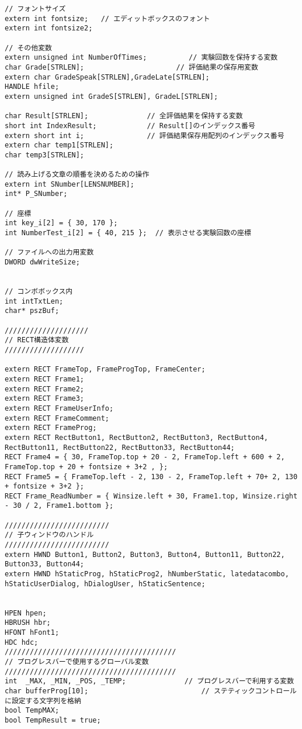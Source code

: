 \begin{lstlisting}[caption=main.cpp]
// フォントサイズ
extern int fontsize;   // エディットボックスのフォント
extern int fontsize2;

// その他変数
extern unsigned int NumberOfTimes;          // 実験回数を保持する変数
char Grade[STRLEN];                      // 評価結果の保存用変数
extern char GradeSpeak[STRLEN],GradeLate[STRLEN];
HANDLE hfile;
extern unsigned int GradeS[STRLEN], GradeL[STRLEN];

char Result[STRLEN];              // 全評価結果を保持する変数
short int IndexResult;            // Result[]のインデックス番号 
extern short int i;               // 評価結果保存用配列のインデックス番号
extern char temp1[STRLEN];
char temp3[STRLEN];

// 読み上げる文章の順番を決めるための操作
extern int SNumber[LENSNUMBER];
int* P_SNumber;

// 座標
int key_i[2] = { 30, 170 };         
int NumberTest_i[2] = { 40, 215 };  // 表示させる実験回数の座標

// ファイルへの出力用変数
DWORD dwWriteSize;


// コンボボックス内
int intTxtLen;
char* pszBuf;

////////////////////
// RECT構造体変数
///////////////////
	
extern RECT FrameTop, FrameProgTop, FrameCenter;
extern RECT Frame1;
extern RECT Frame2;
extern RECT Frame3;
extern RECT FrameUserInfo;
extern RECT FrameComment;
extern RECT FrameProg;
extern RECT RectButton1, RectButton2, RectButton3, RectButton4, RectButton11, RectButton22, RectButton33, RectButton44;
RECT Frame4 = { 30, FrameTop.top + 20 - 2, FrameTop.left + 600 + 2, FrameTop.top + 20 + fontsize + 3+2 , };
RECT Frame5 = { FrameTop.left - 2, 130 - 2, FrameTop.left + 70+ 2, 130 + fontsize + 3+2 };
RECT Frame_ReadNumber = { Winsize.left + 30, Frame1.top, Winsize.right - 30 / 2, Frame1.bottom };

/////////////////////////
// 子ウィンドウのハンドル
/////////////////////////
extern HWND Button1, Button2, Button3, Button4, Button11, Button22, Button33, Button44;
extern HWND hStaticProg, hStaticProg2, hNumberStatic, latedatacombo, hStaticUserDialog, hDialogUser, hStaticSentence;


HPEN hpen;
HBRUSH hbr;
HFONT hFont1;
HDC hdc;
/////////////////////////////////////////
// プログレスバーで使用するグローバル変数
/////////////////////////////////////////
int  _MAX, _MIN, _POS, _TEMP;              // プログレスバーで利用する変数
char bufferProg[10];                           // ステティックコントロールに設定する文字列を格納
bool TempMAX;
bool TempResult = true;


\end{lstlisting}
